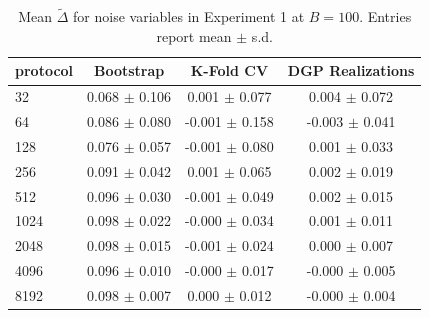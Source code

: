 \begin{table}
\caption{Mean $\widetilde{\Delta}$ for noise variables in Experiment 1 at $B=100$. Entries report mean $\pm$ s.d.}
\label{tab:exp1_noise_delta}
\begin{tabular}{lccc}
\toprule
protocol & Bootstrap & K-Fold CV & DGP Realizations \\
\midrule
32 & 0.068 $\pm$ 0.106 & 0.001 $\pm$ 0.077 & 0.004 $\pm$ 0.072 \\
64 & 0.086 $\pm$ 0.080 & -0.001 $\pm$ 0.158 & -0.003 $\pm$ 0.041 \\
128 & 0.076 $\pm$ 0.057 & -0.001 $\pm$ 0.080 & 0.001 $\pm$ 0.033 \\
256 & 0.091 $\pm$ 0.042 & 0.001 $\pm$ 0.065 & 0.002 $\pm$ 0.019 \\
512 & 0.096 $\pm$ 0.030 & -0.001 $\pm$ 0.049 & 0.002 $\pm$ 0.015 \\
1024 & 0.098 $\pm$ 0.022 & -0.000 $\pm$ 0.034 & 0.001 $\pm$ 0.011 \\
2048 & 0.098 $\pm$ 0.015 & -0.001 $\pm$ 0.024 & 0.000 $\pm$ 0.007 \\
4096 & 0.096 $\pm$ 0.010 & -0.000 $\pm$ 0.017 & -0.000 $\pm$ 0.005 \\
8192 & 0.098 $\pm$ 0.007 & 0.000 $\pm$ 0.012 & -0.000 $\pm$ 0.004 \\
\bottomrule
\end{tabular}
\end{table}
